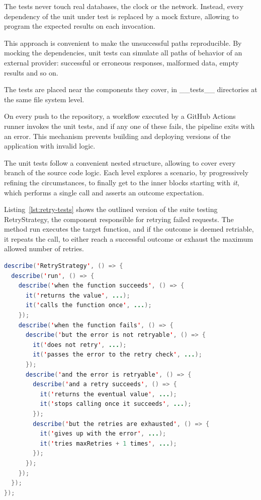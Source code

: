 The tests never touch real databases, the clock or the network.
Instead, every dependency of the unit under test is replaced by a mock fixture, allowing to program the expected results on each invocation.

This approach is convenient to make the unsuccessful paths reproducible.
By mocking the dependencies, unit tests can simulate all paths of behavior of an external provider: successful or erroneous responses, malformed data, empty results and so on.

The tests are placed near the components they cover, in \textsf{\_\_tests\_\_} directories at the same file system level.

On every push to the repository, a workflow executed by a \textsf{GitHub Actions} runner invokes the unit tests, and if any one of these fails, the pipeline exits with an error.
This mechanism prevents building and deploying versions of the application with invalid logic.

The unit tests follow a convenient nested structure, allowing to cover every branch of the source code logic.
Each level explores a scenario, by progressively refining the circumstances, to finally get to the inner blocks starting with \emph{it}, which performs a single call and asserts an outcome expectation.

Listing~\ref{lst:retry-tests} shows the outlined version of the suite testing \textsf{RetryStrategy}, the component responsible for retrying failed requests.
The method \textsf{run} executes the target function, and if the outcome is deemed retriable, it repeats the call, to either reach a successful outcome or exhaust the maximum allowed number of retries.

\begin{lstlisting}[float=tb, language=Java, caption={Structure of the retry strategy unit test suite}, label={lst:retry-tests}]
describe('RetryStrategy', () => {
  describe('run', () => {
    describe('when the function succeeds', () => {
      it('returns the value', ...);
      it('calls the function once', ...);
    });
    describe('when the function fails', () => {
      describe('but the error is not retryable', () => {
        it('does not retry', ...);
        it('passes the error to the retry check', ...);
      });
      describe('and the error is retryable', () => {
        describe('and a retry succeeds', () => {
          it('returns the eventual value', ...);
          it('stops calling once it succeeds', ...);
        });
        describe('but the retries are exhausted', () => {
          it('gives up with the error', ...);
          it('tries maxRetries + 1 times', ...);
        });
      });
    });
  });
});
\end{lstlisting}

